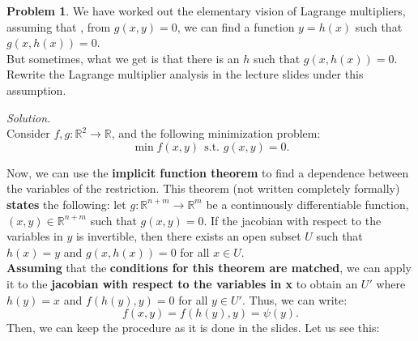 \documentclass[a4paper]{article}
\newenvironment{problem}[2][Problem]
    { \begin{mdframed}[backgroundcolor=gray!20] \vspace*{0.1cm} \textbf{#1 #2}.}
    {  \end{mdframed}\vspace{0.3cm}}
\newenvironment{solution}
    {\textit{Solution.}\\}
    {}
\newcommand{\R}{\mathbb R}
\begin{document}
\begin{problem}{1}
We have worked out the elementary vision of Lagrange multipliers, assuming that , from \(g(x,y) = 0\), we can find a function \(y = h(x)\) such that \(g(x,h(x)) = 0\).\\

But sometimes, what we get is that there is an \(h\) such that \(g(x,h(x)) = 0\). Rewrite the Lagrange multiplier analysis in the lecture slides under this assumption.
\end{problem}
\begin{solution}
  Consider \(f,g:\R^2 \to \R\), and the following minimization problem:
  \begin{equation}\label{p1:problem}
    \min f(x,y) \ \ \text{s.t.  } g(x,y) = 0.
  \end{equation}

  Now, we can use the \textbf{implicit function theorem} to find a dependence between the variables of the restriction. This theorem (not written completely formally) \textbf{states} the following: let \(g:\R^{n+m} \to \R^m\) be a continuously differentiable function, \((x,y) \in \R^{n+m}\) such that \(g(x,y) = 0\). If the jacobian with respect to the variables in \(y\) is invertible, then there exists an open subset \(U\) such that \(h(x) = y\) and \(g(x,h(x)) = 0\) for all \(x \in U\). \\

  \textbf{Assuming} that the \textbf{conditions for this theorem are matched}, we can apply it to the \textbf{jacobian with respect to the variables in x} to obtain an \(U'\) where \(h(y) = x\) and \(f(h(y),y) = 0\) for all \(y \in U'\). Thus, we can write:
  \[
    f(x,y) = f(h(y),y) =  \psi(y).
  \]
  Then, we can keep the procedure as it is done in the slides. Let us see this:\\


\end{solution}
\end{document}
